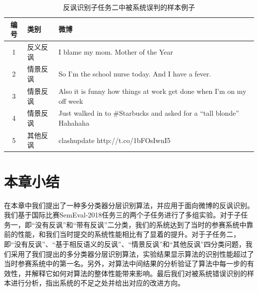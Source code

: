 \begin{table}[htb]
  \centering
  \begin{minipage}[t]{\linewidth} %
  \caption{反讽识别子任务二中被系统误判的样本例子}
  \label{tab:semeval_2018_task3_error}
  \begin{tabularx}{\linewidth}{c|l|X}
    \toprule[1.5pt]
    编号 & 类别 & 微博 \\
    \hline
    1 & 反义反讽 & I blame my mom. Mother of the Year \\
    2 & 情景反讽 & So I'm the school nurse today. And I have a fever. \\
    3 & 情景反讽 & Also it is funny how things at work get done when I'm on my off week \\
    4 & 情景反讽 & Just walked in to \#Starbucks and asked for a “tall blonde” Hahahaha \\
    5 & 其他反讽 & clashupdate http://t.co/1bFOsIwnI5 \\
    \bottomrule[1.5pt]
  \end{tabularx}
  \end{minipage}
\end{table}

\section{本章小结}

在本章中我们提出了一种多分类器分层识别算法，并应用于面向微博的反讽识别。我们基于国际比赛SemEval-2018任务三的两个子任务进行了多组实验。对于子任务一，即“没有反讽”和“带有反讽”二分类，我们的系统达到了当时的参赛系统中靠前的性能，和我们当时提交的系统性能相比有了显着的提升。对于子任务二，即“没有反讽”、“基于相反语义的反讽”、“情景反讽”和“其他反讽”四分类问题，我们采用了我们提出的多分类器分层识别算法，实验结果显示算法的识别性能超过了当时参赛系统中的第一名。另外，对算法中间结果的分析验证了算法中每一步的有效性，并解释它如何对算法的整体性能带来影响。最后我们对被系统错误识别的样本进行分析，指出系统的不足之处并给出对应的改进方向。

